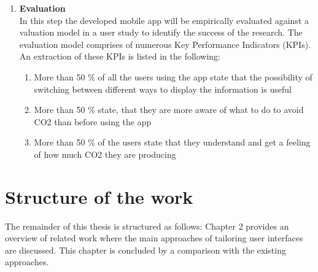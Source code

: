 \begin{enumerate}
	\item \textbf{Evaluation} \\
	In this step the developed mobile app will be empirically evaluated against a valuation model in a user study to identify the success of the research. The evaluation model comprises of numerous Key Performance Indicators (KPIs). An extraction of these KPIs is listed in the following:
	\begin{enumerate}
		\item More than 50 \% of all the users using the app state that the possibility of switching between different ways to display the information is useful
		\item More than 50 \% state, that they are more aware of what to do to avoid CO2 than before using the app
		\item More than 50 \% of the users state that they understand and get a feeling of how much CO2 they are producing
	\end{enumerate}
	
	
\end{enumerate}


\section{Structure of the work} 
The remainder of this thesis is structured as follows:  Chapter 2 provides an overview of related work where the main approaches of tailoring user interfaces are discussed. This chapter is concluded by a comparison with the existing approaches.

%
%
%
%

